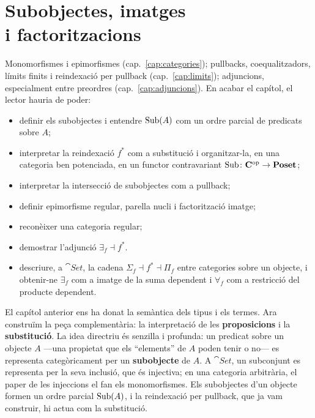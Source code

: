 \chapter[Subobjectes, imatges i factoritzacions]{\texorpdfstring{Subobjectes, imatges\\ i factoritzacions}{Subobjectes, imatges i factoritzacions}}
\label{cap:subobjectes}

\begin{objectius}
 Monomorfismes i epimorfismes (cap.~\ref{cap:categories}); pullbacks, coequalitzadors, límits finits i reindexació per pullback (cap.~\ref{cap:limits}); adjuncions, especialment entre preordres (cap.~\ref{cap:adjuncions}).
 En acabar el capítol, el lector hauria de poder:
\begin{itemize}
  \item definir els subobjectes i entendre $\operatorname{Sub}(A)$ com un ordre parcial de predicats sobre $A$;
  \item interpretar la reindexació $f^{*}$ com a substitució i organitzar-la, en una categoria ben potenciada, en un functor contravariant $\operatorname{Sub}\colon\mathbf{C}^{\mathrm{op}}\to\mathbf{Poset}$;
  \item interpretar la intersecció de subobjectes com a pullback;
  \item definir epimorfisme regular, parella nucli i factorització imatge;
  \item reconèixer una categoria regular;
  \item demostrar l'adjunció $\exists_f\dashv f^{*}$.
  \item descriure, a $\cat{Set}$, la cadena $\Sigma_f\dashv f^{*}\dashv\Pi_f$ entre categories sobre un objecte, i obtenir-ne $\exists_f$ com a imatge de la suma dependent i $\forall_f$ com a restricció del producte dependent.
\end{itemize}
\end{objectius}

El capítol anterior ens ha donat la semàntica dels tipus i els termes. Ara construïm la peça complementària: la interpretació de les \textbf{proposicions} i la \textbf{substitució}. La idea directriu és senzilla i profunda: un predicat sobre un objecte $A$ ---una propietat que els \enquote{elements} de $A$ poden tenir o no--- es representa categòricament per un \textbf{subobjecte} de $A$. A $\cat{Set}$, un subconjunt es representa per la seva inclusió, que és injectiva; en una categoria arbitrària, el paper de les injeccions el fan els monomorfismes. Els subobjectes d'un objecte formen un ordre parcial $\operatorname{Sub}(A)$, i la reindexació per pullback, que ja vam construir, hi actua com la substitució.

